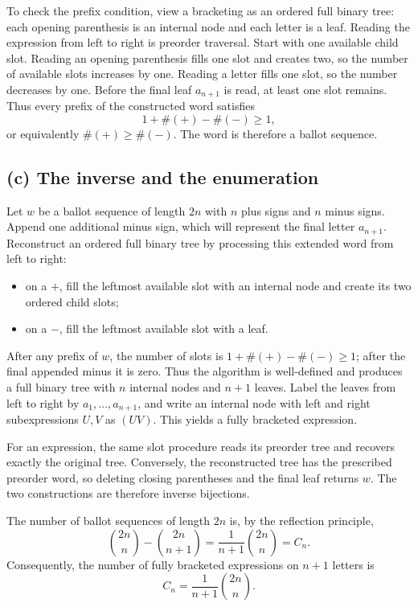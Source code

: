\documentclass[11pt]{article}
\begin{document}
To check the prefix condition, view a bracketing as an ordered full binary
tree: each opening parenthesis is an internal node and each letter is a
leaf. Reading the expression from left to right is preorder traversal. Start
with one available child slot. Reading an opening parenthesis fills one slot
and creates two, so the number of available slots increases by one. Reading a
letter fills one slot, so the number decreases by one. Before the final leaf
\(a_{n+1}\) is read, at least one slot remains. Thus every prefix of the
constructed word satisfies
\[
    1+\#(+)-\#(-)\geq1,
\]
or equivalently \(\#(+)\geq\#(-)\). The word is therefore a ballot sequence.

\subsection*{(c) The inverse and the enumeration}

Let \(w\) be a ballot sequence of length \(2n\) with \(n\) plus signs and
\(n\) minus signs. Append one additional minus sign, which will represent
the final letter \(a_{n+1}\). Reconstruct an ordered full binary tree by
processing this extended word from left to right:
\begin{itemize}[leftmargin=2em]
    \item on a \(+\), fill the leftmost available slot with an internal node
    and create its two ordered child slots;
    \item on a \(-\), fill the leftmost available slot with a leaf.
\end{itemize}
After any prefix of \(w\), the number of slots is
\(1+\#(+)-\#(-)\geq1\); after the final appended minus it is zero. Thus the
algorithm is well-defined and produces a full binary tree with \(n\) internal
nodes and \(n+1\) leaves. Label the leaves from left to right by
\(a_1,\ldots,a_{n+1}\), and write an internal node with left and right
subexpressions \(U,V\) as \((UV)\). This yields a fully bracketed expression.

For an expression, the same slot procedure reads its preorder tree and
recovers exactly the original tree. Conversely, the reconstructed tree has
the prescribed preorder word, so deleting closing parentheses and the final
leaf returns \(w\). The two constructions are therefore inverse bijections.

The number of ballot sequences of length \(2n\) is, by the reflection
principle,
\[
    \binom{2n}{n}-\binom{2n}{n+1}
    =\frac{1}{n+1}\binom{2n}{n}=C_n.
\]
Consequently, the number of fully bracketed expressions on \(n+1\) letters is
\[
\boxed{C_n=\frac{1}{n+1}\binom{2n}{n}.}
\]
\end{document}
